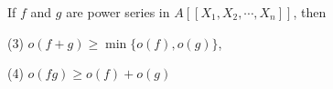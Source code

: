 If $f$ and $g$ are power series in $A[[X_1, X_2, \cdots, X_n]]$, then

(3) $o(f + g) \geq \min\{o(f), o(g)\}$,

(4) $o(fg) \geq o(f) + o(g)$